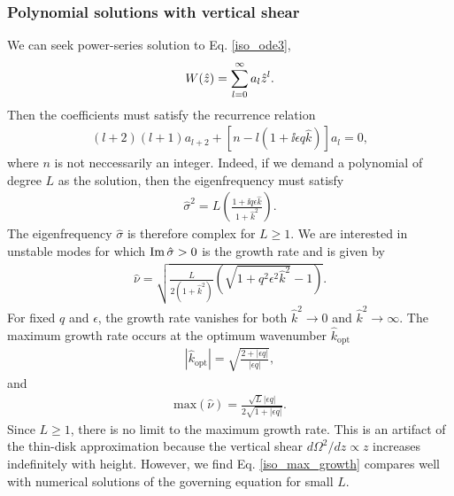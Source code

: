 \subsubsection{Polynomial solutions with vertical shear}\label{iso_poly}
We can seek power-series solution to Eq. \ref{iso_ode3},
\begin{align}
  W(\hat{z}) = \sum_{l=0}^\infty a_l\hat{z}^l. 
\end{align}
Then the coefficients must satisfy the recurrence relation
\begin{align}
  (l+2)(l+1)a_{l+2} +
  \left[n - l\left(1+\ii \epsilon q  \hat{k}\right)\right] a_l = 0, 
\end{align}
where $n$ is not neccessarily an integer. Indeed, if we demand
a polynomial of degree $L$ as the solution, then the eigenfrequency
must satisfy
\begin{align}\label{sig2_iso}
\hat{\sigma}^2 = L\left(\frac{1+\ii q \epsilon
    \hat{k}}{1+\hat{k}^2}\right).
\end{align}
The eigenfrequency $\hat{\sigma}$ is therefore complex for
$L\geq1$. We are interested in 
unstable modes for which $\operatorname{Im}{\hat{\sigma}}>0$ is the growth rate and is
given by 
\begin{align}\label{simple_growth}
  \hat{\nu} =\sqrt{
   \frac{L}{2\left(1+\hat{k}^2\right)}\left(\sqrt{1+q^2\epsilon^2\hat{k}^2} - 
    1\right)}. 
\end{align}
For fixed $q$ and $\epsilon$, the growth rate vanishes for both
$\hat{k}^2\to0$ and $\hat{k}^2\to\infty$. The maximum growth rate
occurs at the optimum wavenumber $\hat{k}_\mathrm{opt}$
\begin{align}
  |\hat{k}_\mathrm{opt}| = \sqrt{\frac{2+|\epsilon q|}{|\epsilon q|}},
\end{align}
and
\begin{align}
  \mathrm{max}\left(\hat{\nu}\right) =\frac{\sqrt{L}|\epsilon
    q|}{2\sqrt{1+|\epsilon q|}}. \label{iso_max_growth}
\end{align}
Since $L\geq1$, there is no limit to the maximum growth rate. This is
an artifact of the thin-disk approximation because the vertical 
shear $d\Omega^2/dz\propto z$ increases indefinitely with
height. However, we find Eq. \ref{iso_max_growth} compares well with
numerical solutions of the governing equation for small $L$.      



